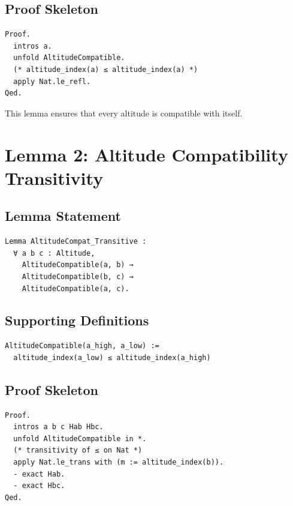 \documentclass[11pt]{article}
\begin{document}
\subsection{Proof Skeleton}

\begin{verbatim}
Proof.
  intros a.
  unfold AltitudeCompatible.
  (* altitude_index(a) ≤ altitude_index(a) *)
  apply Nat.le_refl.
Qed.
\end{verbatim}

This lemma ensures that every altitude is compatible with itself.

\newpage


\section{Lemma 2: Altitude Compatibility Transitivity}

\subsection{Lemma Statement}

\begin{verbatim}
Lemma AltitudeCompat_Transitive :
  ∀ a b c : Altitude,
    AltitudeCompatible(a, b) →
    AltitudeCompatible(b, c) →
    AltitudeCompatible(a, c).
\end{verbatim}

\subsection{Supporting Definitions}

\begin{verbatim}
AltitudeCompatible(a_high, a_low) :=
  altitude_index(a_low) ≤ altitude_index(a_high)
\end{verbatim}

\subsection{Proof Skeleton}

\begin{verbatim}
Proof.
  intros a b c Hab Hbc.
  unfold AltitudeCompatible in *.
  (* transitivity of ≤ on Nat *)
  apply Nat.le_trans with (m := altitude_index(b)).
  - exact Hab.
  - exact Hbc.
Qed.
\end{verbatim}
\end{document}

